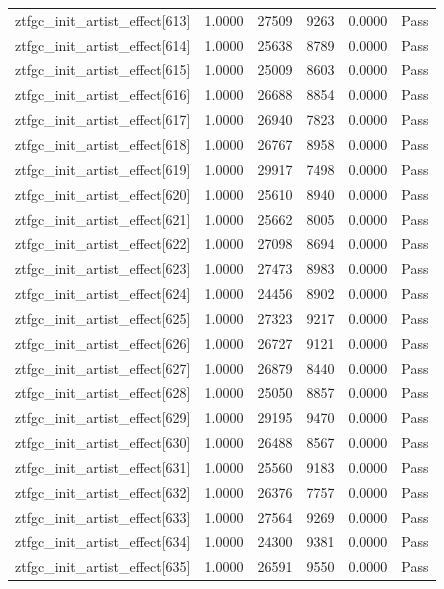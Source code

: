 \begin{table}[htbp]
\begin{tabular}{llrrll}
ztfgc\_init\_artist\_effect[613] & 1.0000 & 27509 & 9263 & 0.0000 & Pass \\
ztfgc\_init\_artist\_effect[614] & 1.0000 & 25638 & 8789 & 0.0000 & Pass \\
ztfgc\_init\_artist\_effect[615] & 1.0000 & 25009 & 8603 & 0.0000 & Pass \\
ztfgc\_init\_artist\_effect[616] & 1.0000 & 26688 & 8854 & 0.0000 & Pass \\
ztfgc\_init\_artist\_effect[617] & 1.0000 & 26940 & 7823 & 0.0000 & Pass \\
ztfgc\_init\_artist\_effect[618] & 1.0000 & 26767 & 8958 & 0.0000 & Pass \\
ztfgc\_init\_artist\_effect[619] & 1.0000 & 29917 & 7498 & 0.0000 & Pass \\
ztfgc\_init\_artist\_effect[620] & 1.0000 & 25610 & 8940 & 0.0000 & Pass \\
ztfgc\_init\_artist\_effect[621] & 1.0000 & 25662 & 8005 & 0.0000 & Pass \\
ztfgc\_init\_artist\_effect[622] & 1.0000 & 27098 & 8694 & 0.0000 & Pass \\
ztfgc\_init\_artist\_effect[623] & 1.0000 & 27473 & 8983 & 0.0000 & Pass \\
ztfgc\_init\_artist\_effect[624] & 1.0000 & 24456 & 8902 & 0.0000 & Pass \\
ztfgc\_init\_artist\_effect[625] & 1.0000 & 27323 & 9217 & 0.0000 & Pass \\
ztfgc\_init\_artist\_effect[626] & 1.0000 & 26727 & 9121 & 0.0000 & Pass \\
ztfgc\_init\_artist\_effect[627] & 1.0000 & 26879 & 8440 & 0.0000 & Pass \\
ztfgc\_init\_artist\_effect[628] & 1.0000 & 25050 & 8857 & 0.0000 & Pass \\
ztfgc\_init\_artist\_effect[629] & 1.0000 & 29195 & 9470 & 0.0000 & Pass \\
ztfgc\_init\_artist\_effect[630] & 1.0000 & 26488 & 8567 & 0.0000 & Pass \\
ztfgc\_init\_artist\_effect[631] & 1.0000 & 25560 & 9183 & 0.0000 & Pass \\
ztfgc\_init\_artist\_effect[632] & 1.0000 & 26376 & 7757 & 0.0000 & Pass \\
ztfgc\_init\_artist\_effect[633] & 1.0000 & 27564 & 9269 & 0.0000 & Pass \\
ztfgc\_init\_artist\_effect[634] & 1.0000 & 24300 & 9381 & 0.0000 & Pass \\
ztfgc\_init\_artist\_effect[635] & 1.0000 & 26591 & 9550 & 0.0000 & Pass \\

\end{tabular}
\end{table}
